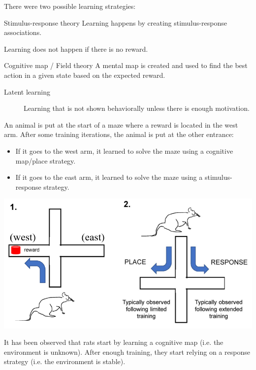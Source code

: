 There were two possible learning strategies:
\begin{descriptionlist}
    \item[Stimulus-response theory] 
        Learning happens by creating stimulus-response associations.

        Learning does not happen if there is no reward.

    \item[Cognitive map / Field theory] 
        A mental map is created and used to find the best action in a given state based on the expected reward.

        \begin{description}
            \item[Latent learning] 
                Learning that is not shown behaviorally unless there is enough motivation.
        \end{description}
\end{descriptionlist}

\begin{casestudy}[Maze]
    An animal is put at the start of a maze where a reward is located in the west arm.
    After some training iterations, the animal is put at the other entrance:
    \begin{itemize}
        \item If it goes to the west arm, it learned to solve the maze using a cognitive map/place strategy.
        \item If it goes to the east arm, it learned to solve the maze using a stimulus-response strategy.
    \end{itemize}
    \begin{center}
        \includegraphics[width=0.55\linewidth]{./img/instrumental_maze.png}
    \end{center}

    It has been observed that rats start by learning a cognitive map (i.e. the environment is unknown).
    After enough training, they start relying on a response strategy (i.e. the environment is stable).
\end{casestudy}

